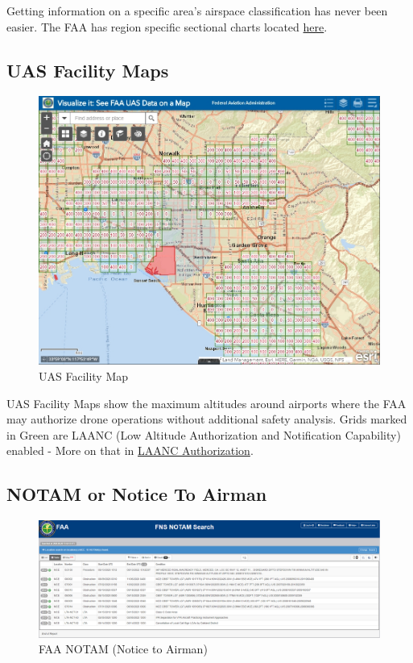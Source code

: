 \documentclass[
  12pt,
]{book}
\begin{document}
Getting information on a specific area's airspace classification has never been easier. The FAA has region specific sectional charts located \href{https://www.faa.gov/air_traffic/flight_info/aeronav/digital_products/vfr/}{here}.

\subsection{UAS Facility Maps}\label{uas-facility-maps}

\begin{figure}

{\centering \includegraphics[width=0.9\linewidth]{images/facility-map} 

}

\caption{UAS Facility Map}\label{fig:facility-map}
\end{figure}

UAS Facility Maps show the maximum altitudes around airports where the FAA may authorize drone operations without additional safety analysis. Grids marked in Green are LAANC (Low Altitude Authorization and Notification Capability) enabled - More on that in \hyperref[LAANC]{LAANC Authorization}.

\subsection{NOTAM or Notice To Airman}\label{notam-or-notice-to-airman}

\begin{figure}
\centering
\includegraphics{images/FAA-Notam.png}
\caption{FAA NOTAM (Notice to Airman)}
\end{figure}
\end{document}
